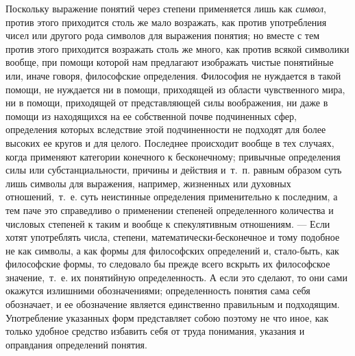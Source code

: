 Поскольку выражение понятий через степени применяется лишь как
{\em символ}, против этого приходится столь же мало
возражать, как против употребления чисел или другого рода символов для
выражения понятия; но вместе с тем против этого приходится возражать столь
же много, как против всякой символики вообще, при помощи которой нам
предлагают изображать чистые понятийные или, иначе говоря, философские
определения. Философия не нуждается в такой помощи, не нуждается ни в
помощи, приходящей из области чувственного мира, ни в помощи, приходящей от
представляющей силы воображения, ни даже в помощи из находящихся на ее
собственной почве подчиненных сфер, определения которых вследствие этой
подчиненности не подходят для более высоких ее кругов и для целого.
Последнее происходит вообще в тех случаях, когда применяют категории
конечного к бесконечному; привычные определения силы или субстанциальности,
причины и действия и~т.~п. равным образом суть лишь символы для выражения,
например, жизненных или духовных отношений,~т.~е. суть неистинные
определения применительно к последним, а тем паче это справедливо о
применении степеней определенного количества и числовых степеней к таким и
вообще к спекулятивным отношениям. — Если хотят употреблять числа, степени,
математически-бесконечное и тому подобное не как символы, а как формы для
философских определений и, стало-быть, как философские формы, то следовало
бы прежде всего вскрыть их философское значение,~т.~е. их понятийную
определенность. А если это сделают, то они сами окажутся излишними
обозначениями; определенность понятия сама себя обозначает, и ее
обозначение является единственно правильным и подходящим. Употребление
указанных форм представляет собою поэтому не что иное, как только удобное
средство избавить себя от труда понимания, указания и оправдания
определений понятия.

\clearpage\setcounter{page}{1}
\bigskip

